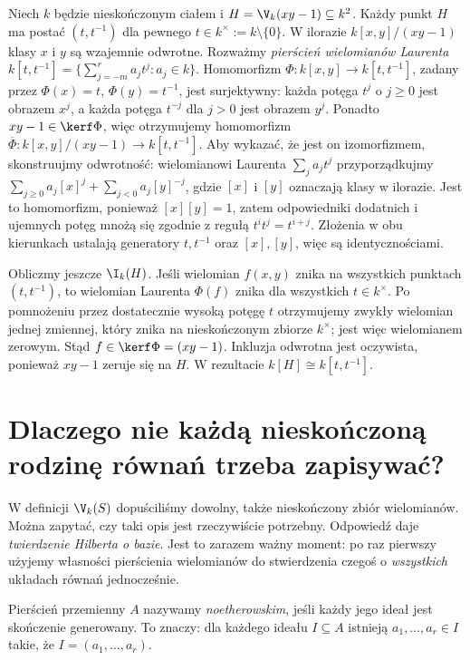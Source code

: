 \begin{przyklad}
Niech $k$ będzie nieskończonym ciałem i
$H=\V_k(xy-1)\subseteq k^2$. Każdy punkt $H$ ma postać
$(t,t^{-1})$ dla pewnego $t\in k^\times:=k\setminus\{0\}$.
W ilorazie $k[x,y]/(xy-1)$ klasy $x$ i $y$ są wzajemnie
odwrotne. Rozważmy \emph{pierścień wielomianów Laurenta}
$k[t,t^{-1}]=\{\sum_{j=-m}^r a_jt^j:a_j\in k\}$.
Homomorfizm $\Phi:k[x,y]\to k[t,t^{-1}]$, zadany przez
$\Phi(x)=t$, $\Phi(y)=t^{-1}$, jest surjektywny:
każda potęga $t^j$ o $j\ge0$ jest obrazem $x^j$, a każda
potęga $t^{-j}$ dla $j>0$ jest obrazem $y^j$.
Ponadto $xy-1\in\kerf\Phi$, więc otrzymujemy homomorfizm
$\overline\Phi:k[x,y]/(xy-1)\to k[t,t^{-1}]$.
Aby wykazać, że jest on izomorfizmem, skonstruujmy odwrotność:
wielomianowi Laurenta $\sum_j a_jt^j$ przyporządkujmy
$\sum_{j\ge0}a_j[x]^j+\sum_{j<0}a_j[y]^{-j}$,
gdzie $[x]$ i $[y]$ oznaczają klasy w ilorazie.
Jest to homomorfizm, ponieważ $[x][y]=1$, zatem
odpowiedniki dodatnich i ujemnych potęg mnożą się zgodnie
z regułą $t^it^j=t^{i+j}$. Złożenia w obu kierunkach
ustalają generatory $t,t^{-1}$ oraz $[x],[y]$, więc są identycznościami.

Obliczmy jeszcze $\I_k(H)$. Jeśli wielomian $f(x,y)$ znika na
wszystkich punktach $(t,t^{-1})$, to wielomian Laurenta
$\Phi(f)$ znika dla wszystkich $t\in k^\times$.
Po pomnożeniu przez dostatecznie wysoką potęgę $t$
otrzymujemy zwykły wielomian jednej zmiennej, który znika
na nieskończonym zbiorze $k^\times$; jest więc wielomianem zerowym.
Stąd $f\in\kerf\Phi=(xy-1)$. Inkluzja odwrotna jest
oczywista, ponieważ $xy-1$ zeruje się na $H$. W rezultacie
$k[H]\cong k[t,t^{-1}]$.
\end{przyklad}

\section{Dlaczego nie każdą nieskończoną rodzinę równań trzeba zapisywać?}

W definicji $\V_k(S)$ dopuściliśmy dowolny, także nieskończony
zbiór wielomianów. Można zapytać, czy taki opis jest rzeczywiście
potrzebny. Odpowiedź daje \emph{twierdzenie Hilberta o bazie}.
Jest to zarazem ważny moment: po raz pierwszy użyjemy własności
pierścienia wielomianów do stwierdzenia czegoś o \emph{wszystkich}
układach równań jednocześnie.

\begin{definicja}
Pierścień przemienny $A$ nazywamy \emph{noetherowskim}, jeśli każdy
jego ideał jest skończenie generowany.
To znaczy: dla każdego ideału $I\subseteq A$ istnieją
$a_1,\dots,a_r\in I$ takie, że $I=(a_1,\dots,a_r)$.
\end{definicja}

